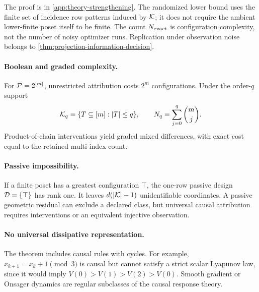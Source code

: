 The proof is in \cref{app:theory-strengthening}.  The randomized lower bound uses the finite set of incidence row patterns induced by $\mathcal K$; it does not require the ambient lower-finite poset itself to be finite.  The count $N_{\rm exact}$ is configuration complexity, not the number of noisy optimizer runs.  Replication under observation noise belongs to \cref{thm:projection-information-decision}.

\paragraph{Boolean and graded complexity.}
For $\mathcal P=2^{[m]}$, unrestricted attribution costs $2^m$ configurations.  Under the order-$q$ support
\[
\mathcal K_q=\{T\subseteq[m]:|T|\le q\},
\qquad
N_q=\sum_{j=0}^q\binom mj.
\]
Product-of-chain interventions yield graded mixed differences, with exact cost equal to the retained multi-index count.

\paragraph{Passive impossibility.}
If a finite poset has a greatest configuration $\top$, the one-row passive design $\mathcal D=\{\top\}$ has rank one.  It leaves $d(|\mathcal K|-1)$ unidentifiable coordinates.  A passive geometric residual can exclude a declared class, but universal causal attribution requires interventions or an equivalent injective observation.

\paragraph{No universal dissipative representation.}
The theorem includes causal rules with cycles.  For example, $x_{k+1}=x_k+1\pmod 3$ is causal but cannot satisfy a strict scalar Lyapunov law, since it would imply $V(0)>V(1)>V(2)>V(0)$.  Smooth gradient or Onsager dynamics are regular subclasses of the causal response theory.
